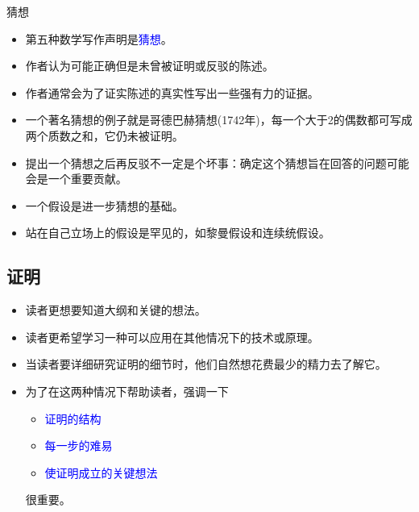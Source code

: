 \documentclass[13pt]{ctexbeamer}
\newcommand{\blue}[1]{\textcolor{blue}{#1}}
\begin{document}
\begin{frame}{猜想}
\begin{itemize}
\item 第五种数学写作声明是\blue{猜想}。
\item 作者认为可能正确但是未曾被证明或反驳的陈述。
\item 作者通常会为了证实陈述的真实性写出一些强有力的证据。
\item  一个著名猜想的例子就是哥德巴赫猜想(1742年)，每一个大于2的偶数都可写成两个质数之和，它仍未被证明。
\item 提出一个猜想之后再反驳不一定是个坏事：确定这个猜想旨在回答的问题可能会是一个重要贡献。

\end{itemize}
\end{frame}

\begin{frame}
\begin{itemize}
\item 一个假设是进一步猜想的基础。
\item 站在自己立场上的假设是罕见的，如黎曼假设和连续统假设。
\end{itemize}
\end{frame}


\subsection{证明}

\begin{frame}
	\begin{itemize}
		\item 读者更想要知道大纲和关键的想法。
		\item 读者更希望学习一种可以应用在其他情况下的技术或原理。
		\item 当读者要详细研究证明的细节时，他们自然想花费最少的精力去了解它。
		\item 为了在这两种情况下帮助读者，强调一下
		\begin{itemize}
		\item \blue{证明的结构}
		\item \blue{每一步的难易}
		\item \blue{使证明成立的关键想法}
		\end{itemize}
		很重要。
		
	\end{itemize}
\end{frame}
\end{document}
